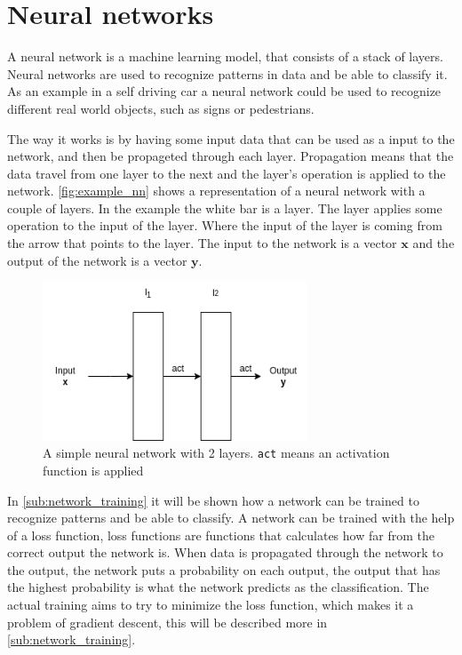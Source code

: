 \section{Neural networks}%
\label{sec:Neural networks}

A neural network is a machine learning model, that consists of a stack of layers. Neural networks are used to recognize patterns in data and be able to classify it. As an example in a self driving car a neural network could be used to recognize different real world objects, such as signs or pedestrians.

The way it works is by having some input data that can be used as a input to the network, and then be propageted through each layer. Propagation means that the data travel from one layer to the next and the layer's operation is applied to the network. \autoref{fig:example_nn} shows  a representation of a neural network with a couple of layers. In the example the white bar is a layer. The layer applies some operation to the input of the layer. Where the input of the layer is coming from the arrow that points to the layer. The input to the network is a vector $\bm{x}$ and the output of the network is a vector $\bm{y}$.

\begin{figure}
    \centering
    \includegraphics[width=0.7\textwidth]{assets/nn-simple-example.png}
    \caption{A simple neural network with 2 layers. \texttt{act} means an activation function is applied}
    \label{fig:example_nn}
\end{figure}

In \autoref{sub:network_training} it will be shown how a network can be trained to recognize patterns and be able to classify. A network can be trained with the help of a loss function, loss functions are functions that calculates how far from the correct output the network is.
When data is propagated through the network to the output, the network puts a probability on each output, the output that has the highest probability is what the network predicts as the classification.
The actual training aims to try to minimize the loss function, which makes it a problem of gradient descent, this will be described more in \autoref{sub:network_training}.

